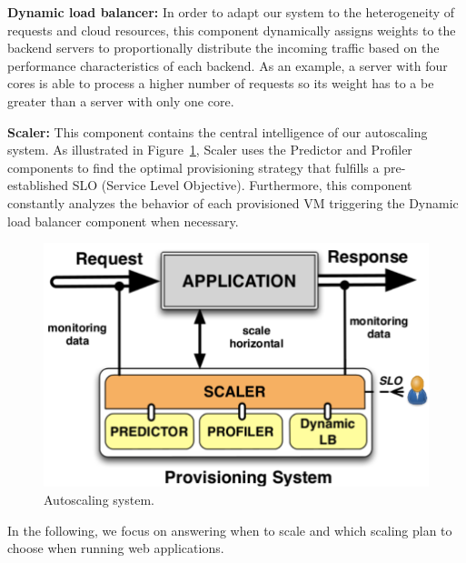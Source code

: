
\vspace{2mm}

\textbf{Dynamic load balancer: } In order to adapt our system to the heterogeneity of requests and cloud resources, this component dynamically assigns weights to the backend servers to proportionally distribute the incoming traffic based on the performance characteristics of each backend. As an example, a server with four cores is able to process a higher number of requests so its weight has to a be greater than a server with only one core.

\vspace{2mm}

\textbf{Scaler:} This component contains the central intelligence of our autoscaling system. As illustrated in Figure~\ref{autoScalingSys}, Scaler uses the Predictor and Profiler components to find the optimal provisioning strategy that fulfills a pre-established SLO (Service Level Objective). Furthermore, this component constantly analyzes the behavior of each provisioned VM triggering the Dynamic load balancer component when necessary.

\begin{figure}[htb]
  \begin{center}
    \includegraphics[width=.85\linewidth]{images/monitoringSchema}
  \end{center}
\vspace{-5mm}
  \caption{Autoscaling system.}
  \label{autoScalingSys}
\end{figure}

In the following, we focus on answering when to scale and which scaling plan to choose when running web applications.

